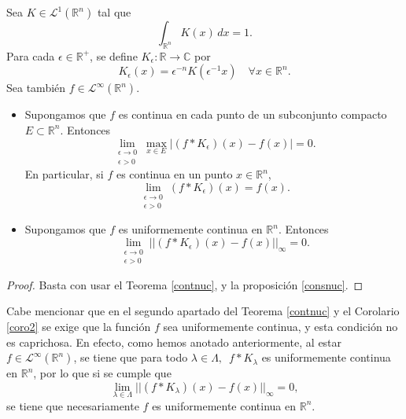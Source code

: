 \begin{corolario}  \label{coro2}
    Sea $K  \in \mathscr{L}^1(\mathbb{R}^n)$ tal que 
    \begin{equation}
        \int_{\mathbb{R}^n}K(x) \, dx = 1.
    \end{equation}
    Para cada $\epsilon \in \mathbb{R}^+$, se define $K_{\epsilon}: \mathbb{R} \rightarrow \mathbb{C}$ por
    \begin{equation}
        K_{\epsilon}(x) = \epsilon^{-n}K(\epsilon^{-1}x) \quad \forall x \in \mathbb{R}^n.
    \end{equation}
     Sea también $f \in \mathscr{L}^{\infty}(\mathbb{R}^n)$.
    \begin{itemize}
        \item Supongamos que $f$ es continua en cada punto de un subconjunto compacto $E \subset \mathbb{R}^n$. Entonces
        \begin{equation}
            \lim_{\substack{\epsilon \rightarrow 0 \\ \epsilon > 0}} \max_{x \in E} |(f*K_{\epsilon})(x)-f(x)|=0.
        \end{equation}
        En particular, si $f$ es continua en un punto $x \in \mathbb{R}^n$,
         \begin{equation}
            \lim_{\substack{\epsilon \rightarrow 0 \\ \epsilon > 0}} (f*K_{\epsilon})(x)=f(x).
        \end{equation}
        \item Supongamos que $f$ es uniformemente continua en $\mathbb{R}^n$. Entonces
        \begin{equation}
           \lim_{\substack{\epsilon \rightarrow 0 \\ \epsilon > 0}} ||(f*K_{\epsilon})(x)-f(x)||_{\infty}=0.
        \end{equation}
    \end{itemize}
\end{corolario}


\begin{proof}
    Basta con usar el Teorema \ref{contnuc}, y la proposición \ref{consnuc}.
\end{proof}

\begin{observacion}
    Cabe mencionar que en el segundo apartado del Teorema \ref{contnuc} y el Corolario \ref{coro2} se exige que la función $f$ sea uniformemente continua, y esta condición no es caprichosa. En efecto, como hemos anotado anteriormente, al estar $f \in \mathscr{L}^{\infty}(\mathbb{R}^n)$, se tiene que  para todo $\lambda \in \Lambda, \, \,\,  f*K_{\lambda}$ es uniformemente continua en $\mathbb{R}^n$, por lo que si se cumple que
    \begin{equation}
            \lim_{\lambda  \in \Lambda} ||(f*K_{\lambda})(x)-f(x)||_{\infty}=0,
    \end{equation}
    se tiene que necesariamente $f$ es uniformemente continua en $\mathbb{R}^n$.
\end{observacion}


